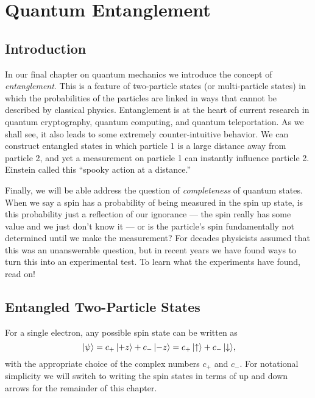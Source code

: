 
\chapter{Quantum Entanglement}
\label{chapter:quantum_entanglement}

\section{Introduction}

In our final chapter on quantum mechanics we introduce the concept of
\textit{entanglement}.  This is a feature of two-particle states (or
multi-particle states) in which the probabilities of the particles are
linked in ways that cannot be described by classical physics.
Entanglement is at the heart of current research in quantum
cryptography, quantum computing, and quantum teleportation.  As we
shall see, it also leads to some extremely counter-intuitive behavior.
We can construct entangled states in which particle 1 is a large
distance away from particle 2, and yet a measurement on particle 1 can
instantly influence particle 2.  Einstein called this ``spooky action
at a distance.''

Finally, we will be able address the question of \textit{completeness}
of quantum states.  When we say a spin has a probability of being
measured in the spin up state, is this probability just a reflection
of our ignorance --- the spin really has some value and we just don't
know it --- or is the particle's spin fundamentally not determined
until we make the measurement?  For decades physicists assumed that
this was an unanswerable question, but in recent years we have found
ways to turn this into an experimental test.  To learn what the
experiments have found, read on!

\section{Entangled Two-Particle States}

For a single electron, any possible spin state can be written as
\begin{equation}
\,|\mbox{$\psi$}\rangle = c_+\,|\mbox{$+z$}\rangle + c_-\,|\mbox{$-z$}\rangle = c_+\,|\mbox{$\uparrow$}\rangle
 + c_-\,|\mbox{$\downarrow$}\rangle,
\label{eq:spin_half_state}
\end{equation}
with the appropriate choice of the complex numbers $c_+$ and $c_-$.
For notational simplicity we will switch to writing the spin states in
terms of up and down arrows for the remainder of this chapter.

